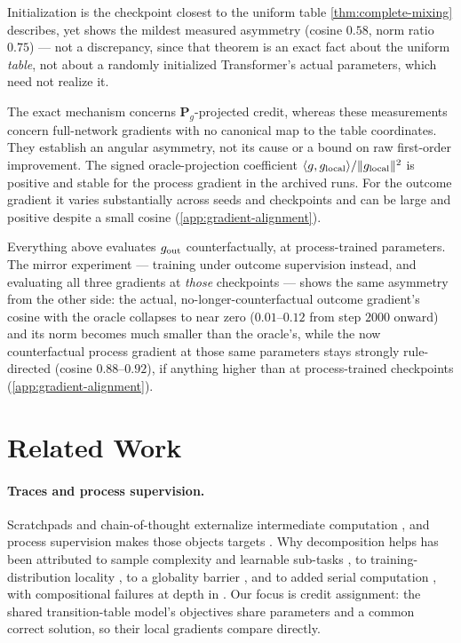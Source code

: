 Initialization is the checkpoint closest to the uniform table
\cref{thm:complete-mixing} describes, yet shows the mildest measured
asymmetry (cosine $0.58$, norm ratio $0.75$) --- not a discrepancy, since
that theorem is an exact fact about the uniform \emph{table}, not about a
randomly initialized Transformer's actual parameters, which need not
realize it.

The exact mechanism concerns $\bm P_g$-projected credit, whereas these
measurements concern full-network gradients with no canonical map to the
table coordinates. They establish an angular asymmetry, not its cause or
a bound on raw first-order improvement. The signed oracle-projection
coefficient $\langle g,g_{\rm local}\rangle/\|g_{\rm local}\|^2$ is positive
and stable for the process gradient in the archived runs. For the outcome
gradient it varies substantially across seeds and checkpoints and can
be large and positive despite a small cosine (\cref{app:gradient-alignment}).

Everything above evaluates $g_{\rm out}$ counterfactually, at
process-trained parameters. The mirror experiment --- training under
outcome supervision instead, and evaluating all three gradients at
\emph{those} checkpoints --- shows the same asymmetry from the other
side: the actual, no-longer-counterfactual outcome gradient's cosine
with the oracle collapses to near zero ($0.01$--$0.12$ from step $2000$
onward) and its norm becomes much smaller than the oracle's, while the now
counterfactual process gradient at those same parameters stays strongly
rule-directed (cosine $0.88$--$0.92$), if anything higher than at
process-trained checkpoints (\cref{app:gradient-alignment}).

\section{Related Work}
\label{sec:related}

\paragraph{Traces and process supervision.}
Scratchpads and chain-of-thought externalize intermediate computation
\citep{nye2021scratchpads,wei2022cot}, and process supervision makes those
objects targets \citep{cobbe2021training,uesato2022solving,lightman2023verify}.
Why decomposition helps has been attributed to sample complexity and learnable
sub-tasks \citep{wies2023subtask,hanneke2026samplecomplexityautoregressivereasoning},
to training-distribution locality \citep{prystawski2023think}, to a
globality barrier \citep{abbe2024globality,abbe2023sgd}, and to added serial
computation
\citep{feng2023towards,merrill2024expressive,li2024chain,malach2023autoregressive},
with compositional failures at depth in \citet{dziri2023faith}.  Our focus is
credit assignment: the shared transition-table model's objectives share
parameters and a common correct solution, so their local gradients compare
directly.

